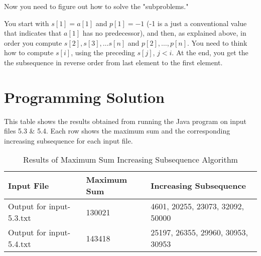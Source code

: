 \documentclass[11pt]{article}
\begin{document}
Now you need to figure out how to solve the "subproblems."

You start with $s[1] = a[1]$ and $p[1] = -1$ (-1 is a just a conventional value that indicates that $a[1]$ has no predecessor), and then, as explained above, in order you compute $s[2], s[3], \ldots s[n]$ and $p[2], \ldots, p[n]$. You need to think how to compute $s[i]$, using the preceding $s[j]$, $j < i$. At the end, you get the the subsequence in reverse order from last element to the first element.
\newpage
\section*{Programming Solution}
This table shows the results obtained from running the Java program on input files 5.3 & 5.4. Each row shows the maximum sum and the corresponding increasing subsequence for each input file.

\begin{table}[h]
    \centering
    \begin{tabular}{llp{6cm}}
        \toprule
        \textbf{Input File} & \textbf{Maximum Sum} & \textbf{Increasing Subsequence} \\
        \midrule
        Output for input-5.3.txt & 130021 & 4601, 20255, 23073, 32092, 50000 \\
        Output for input-5.4.txt & 143418 & 25197, 26355, 29960, 30953, 30953 \\
        \bottomrule
    \end{tabular}
    \caption{Results of Maximum Sum Increasing Subsequence Algorithm}
    \label{tab:results}
\end{table}
\newpage
\end{document}
